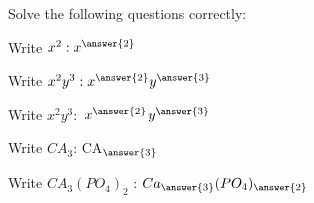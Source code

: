 \documentclass{ximera}
\begin{document}

    \begin{exercise} Solve the following questions correctly:

        \begin{question} Write $x^2: x^{\answer{2}}$
        \end{question}

        \begin{question} Write $x^2y^3: x^{\answer{2}}y^{\answer{3}}$
        \end{question}

        \begin{question} Write $x^2y^3:$ $x^{\answer{2}}${}$y^{\answer{3}}$
        \end{question}

        \begin{question} Write $CA_3$: CA${}_{\answer{3}}$
        \end{question}

        \begin{question} Write $CA_3(PO_4)_2$ : 
            $Ca_{\answer{3}}(PO_4)_{\answer{2}}$ 
        \end{question}

    \end{exercise}
\end{document}
